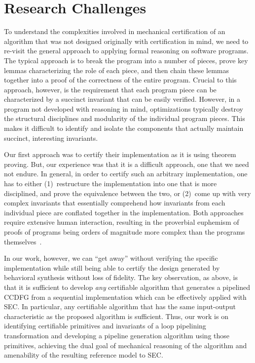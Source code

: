 \section{Research Challenges}
\label{sec:challenges}

To understand the complexities involved in mechanical
certification of an algorithm that was not designed
originally with certification in mind, we need to re-visit
the general approach to applying formal reasoning on
software programs.  The typical approach is to break the
program into a number of pieces, prove key lemmas
characterizing the role of each piece, and then chain these
lemmas together into a proof of the correctness of the
entire program. Crucial to this approach, however, is the
requirement that each program piece can be characterized by
a succinct invariant that can be easily verified.  However,
in a program not developed with reasoning in mind,
optimizations typically destroy the structural disciplines
and modularity of the individual program pieces. This makes it
difficult to identify and isolate the components that
actually maintain succinct, interesting invariants.


Our first approach was to certify their implementation as it is using theorem proving. But, our experience was that it is a difficult approach, one that we need not endure. In general, in order to certify such an arbitrary implementation,
one has to either (1)~restructure the implementation into
one that is more disciplined, and prove the equivalence
between the two, or (2)~come up with very complex
invariants that essentially comprehend how invariants from
each individual piece are conflated together in the
implementation.  Both approaches require extensive human
interaction, resulting in the proverbial euphemism of proofs
of programs being orders of magnitude more complex than the
programs themselves~\cite{liu}.

In our work, however, we can ``get away'' without verifying
the specific implementation while still being able to
certify the design generated by behavioral synthesis without
loss of fidelity. The key observation, as above, is that it
is sufficient to develop {\em any} certifiable algorithm
that generates a pipelined CCDFG from a sequential
implementation which can be effectively applied with SEC.
In particular, any certifiable algorithm that has the same
input-output characteristic as the proposed algorithm
is sufficient.  Thus, our work is on identifying
certifiable primitives and invariants of a loop pipelining
transformation and developing a pipeline generation
algorithm using those primitives, achieving the dual goal of
mechanical reasoning of the algorithm and amenability of the
resulting reference model to SEC.

